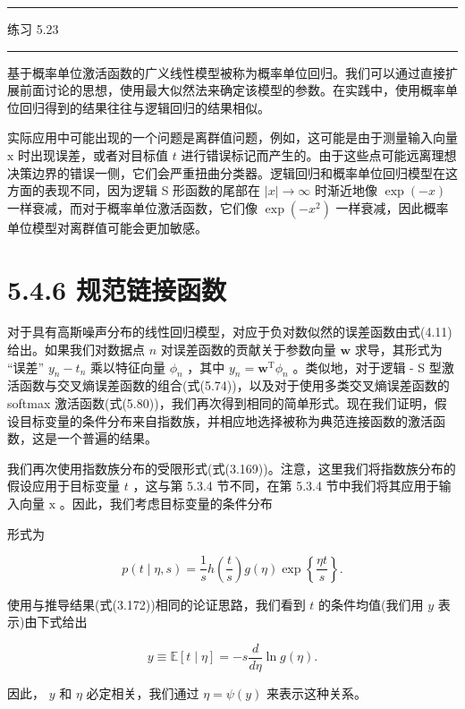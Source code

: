 \documentclass[10pt]{article}
\newcommand{\HRule}{\begin{center}\rule{0.9\linewidth}{0.2mm}\end{center}}
\begin{document}
\HRule

练习 5.23

\HRule

基于概率单位激活函数的广义线性模型被称为概率单位回归。我们可以通过直接扩展前面讨论的思想，使用最大似然法来确定该模型的参数。在实践中，使用概率单位回归得到的结果往往与逻辑回归的结果相似。

实际应用中可能出现的一个问题是离群值问题，例如，这可能是由于测量输入向量 \(\mathrm{x}\) 时出现误差，或者对目标值 \(t\) 进行错误标记而产生的。由于这些点可能远离理想决策边界的错误一侧，它们会严重扭曲分类器。逻辑回归和概率单位回归模型在这方面的表现不同，因为逻辑 S 形函数的尾部在 \(\left| x\right|  \rightarrow  \infty\) 时渐近地像 \(\exp \left( {-x}\right)\) 一样衰减，而对于概率单位激活函数，它们像 \(\exp \left( {-{x}^{2}}\right)\) 一样衰减，因此概率单位模型对离群值可能会更加敏感。

\section*{5.4.6 规范链接函数}

对于具有高斯噪声分布的线性回归模型，对应于负对数似然的误差函数由式(4.11)给出。如果我们对数据点 \(n\) 对误差函数的贡献关于参数向量 \(\mathbf{w}\) 求导，其形式为 “误差” \({y}_{n} - {t}_{n}\) 乘以特征向量 \({\phi }_{n}\) ，其中 \({y}_{n} = {\mathbf{w}}^{\mathrm{T}}{\phi }_{n}\) 。类似地，对于逻辑 - S 型激活函数与交叉熵误差函数的组合(式(5.74))，以及对于使用多类交叉熵误差函数的 softmax 激活函数(式(5.80))，我们再次得到相同的简单形式。现在我们证明，假设目标变量的条件分布来自指数族，并相应地选择被称为典范连接函数的激活函数，这是一个普遍的结果。

我们再次使用指数族分布的受限形式(式(3.169))。注意，这里我们将指数族分布的假设应用于目标变量 \(t\) ，这与第 5.3.4 节不同，在第 5.3.4 节中我们将其应用于输入向量 \(\mathrm{x}\) 。因此，我们考虑目标变量的条件分布

形式为

\[
p\left( {t \mid  \eta ,s}\right)  = \frac{1}{s}h\left( \frac{t}{s}\right) g\left( \eta \right) \exp \left\{  \frac{\eta t}{s}\right\}  . \tag{5.89}
\]

使用与推导结果(式(3.172))相同的论证思路，我们看到 \(t\) 的条件均值(我们用 \(y\) 表示)由下式给出

\[
y \equiv  \mathbb{E}\left\lbrack  {t \mid  \eta }\right\rbrack   =  - s\frac{d}{d\eta }\ln g\left( \eta \right) . \tag{5.90}
\]

因此， \(y\) 和 \(\eta\) 必定相关，我们通过 \(\eta  = \psi \left( y\right)\) 来表示这种关系。
\end{document}
